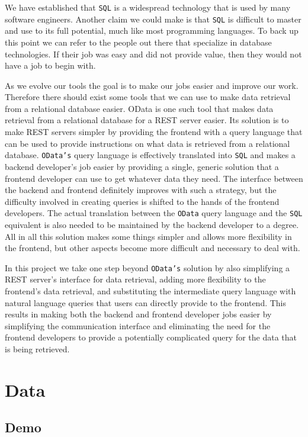\documentclass[11pt]{article}
\begin{document}
We have established that \texttt{SQL} is a widespread technology that is used by many software engineers. Another claim we could make is that \texttt{SQL} is difficult to master and use to its full potential, much like most programming languages. To back up this point we can refer to the people out there that specialize in database technologies. If their job was easy and did not provide value, then they would not have a job to begin with.

As we evolve our tools the goal is to make our jobs easier and improve our work. Therefore there should exist some tools that we can use to make data retrieval from a relational database easier. OData \citep{odata} is one such tool that makes data retrieval from a relational database for a REST server easier. Its solution is to make REST servers simpler by providing the frontend with a query language that can be used to provide instructions on what data is retrieved from a relational database. \texttt{OData's} query language is effectively translated into \texttt{SQL} and makes a backend developer's job easier by providing a single, generic solution that a frontend developer can use to get whatever data they need. The interface between the backend and frontend definitely improves with such a strategy, but the difficulty involved in creating queries is shifted to the hands of the frontend developers. The actual translation between the \texttt{OData} query language and the \texttt{SQL} equivalent is also needed to be maintained by the backend developer to a degree. All in all this solution makes some things simpler and allows more flexibility in the frontend, but other aspects become more difficult and necessary to deal with.

In this project we take one step beyond \texttt{OData's} solution by also simplifying a REST server's interface for data retrieval, adding more flexibility to the frontend's data retrieval, and substituting the intermediate query language with natural language queries that users can directly provide to the frontend. This results in making both the backend and frontend developer jobs easier by simplifying the communication interface and eliminating the need for the frontend developers to provide a potentially complicated query for the data that is being retrieved.

\section{Data}

\subsection{Demo}
\end{document}

